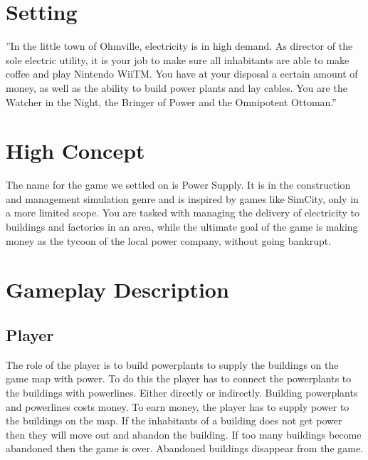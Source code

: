 \section{Setting}
    ”In the little town of Ohmville, electricity is in high demand. As director of the sole electric
    utility, it is your job to make sure all inhabitants are able to make coffee and play Nintendo
    WiiTM. You have at your disposal a certain amount of money, as well as the ability to build
    power plants and lay cables. You are the Watcher in the Night, the Bringer of Power and the
    Omnipotent Ottoman.”

\section{High Concept}
    The name for the game we settled on is Power Supply. It is in the construction and management 
    simulation genre and is inspired by games like SimCity, only in a more limited scope. You are 
    tasked with managing the delivery of electricity to buildings and factories in an area, while the 
    ultimate goal of the game is making money as the tycoon of the local power company, without going 
    bankrupt.

\section{Gameplay Description}

\subsection*{Player}
    The role of the player is to build powerplants to supply the buildings on the game map with power. 
    To do this the player has to connect the powerplants to the buildings with powerlines. Either directly
    or indirectly. Building powerplants and powerlines costs money. To earn money, the player has to supply
    power to the buildings on the map. If the inhabitants of a building does not get power then they will
    move out and abandon the building. If too many buildings become abandoned then the game is over.
    Abandoned buildings disappear from the game.

